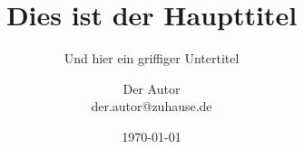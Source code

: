 \documentclass[aspectratio=43]{beamer}
\begin{document}

\title{Dies ist der Haupttitel}
\subtitle{Und hier ein griffiger Untertitel}
\author{Der Autor\\der.autor@zuhause.de}
\date{\today}
\frame[plain]{\maketitle}


\frame{\blindtext}
\end{document}

